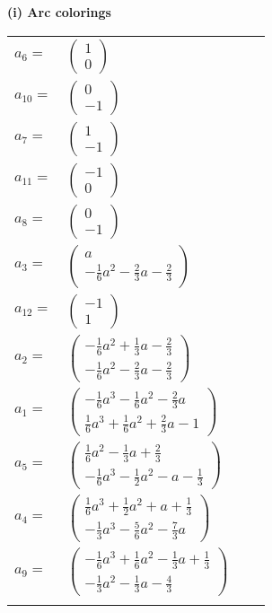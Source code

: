 \documentclass[1p]{elsarticle_modified}
\theoremstyle{definition}
\begin{document}
\flushleft \textbf{(i) Arc colorings}\\
\begin{tabular}{m{7pt} m{180pt} m{7pt} m{180pt} }
\flushright $a_{6}=$&$\begin{pmatrix}1\\0\end{pmatrix}$ \\
\flushright $a_{10}=$&$\begin{pmatrix}0\\-1\end{pmatrix}$ \\
\flushright $a_{7}=$&$\begin{pmatrix}1\\-1\end{pmatrix}$ \\
\flushright $a_{11}=$&$\begin{pmatrix}-1\\0\end{pmatrix}$ \\
\flushright $a_{8}=$&$\begin{pmatrix}0\\-1\end{pmatrix}$ \\
\flushright $a_{3}=$&$\begin{pmatrix}a\\-\frac{1}{6} a^2-\frac{2}{3} a-\frac{2}{3}\end{pmatrix}$ \\
\flushright $a_{12}=$&$\begin{pmatrix}-1\\1\end{pmatrix}$ \\
\flushright $a_{2}=$&$\begin{pmatrix}-\frac{1}{6} a^2+\frac{1}{3} a-\frac{2}{3}\\-\frac{1}{6} a^2-\frac{2}{3} a-\frac{2}{3}\end{pmatrix}$ \\
\flushright $a_{1}=$&$\begin{pmatrix}-\frac{1}{6} a^3-\frac{1}{6} a^2-\frac{2}{3} a\\\frac{1}{6} a^3+\frac{1}{6} a^2+\frac{2}{3} a-1\end{pmatrix}$ \\
\flushright $a_{5}=$&$\begin{pmatrix}\frac{1}{6} a^2-\frac{1}{3} a+\frac{2}{3}\\-\frac{1}{6} a^3-\frac{1}{2} a^2- a-\frac{1}{3}\end{pmatrix}$ \\
\flushright $a_{4}=$&$\begin{pmatrix}\frac{1}{6} a^3+\frac{1}{2} a^2+a+\frac{1}{3}\\-\frac{1}{3} a^3-\frac{5}{6} a^2-\frac{7}{3} a\end{pmatrix}$ \\
\flushright $a_{9}=$&$\begin{pmatrix}-\frac{1}{6} a^3+\frac{1}{6} a^2-\frac{1}{3} a+\frac{1}{3}\\-\frac{1}{3} a^2-\frac{1}{3} a-\frac{4}{3}\end{pmatrix}$\\&\end{tabular}
\end{document}
